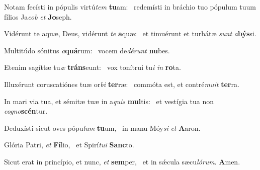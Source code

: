 \item Notam fecísti in pópulis virtú\textit{tem} \textbf{tu}am:~\psstar{} redemísti in bráchio tuo pópulum tuum fílios Ja\textit{cob} \textit{et} \textbf{Jo}seph.

\item Vidérunt te aquæ, Deus, vidérunt \textit{te} \textbf{a}quæ:~\psstar{} et timuérunt et turbátæ \textit{sunt} \textit{a}\textbf{býs}si.

\item Multitúdo sónitus \textit{a}\textbf{quá}rum:~\psstar{} vocem de\textit{dérunt} \textbf{nu}bes.

\item Etenim sagíttæ tu\textit{æ} \textbf{tráns}eunt:~\psstar{} vox tonítrui tu\textit{i} \textit{in} \textbf{ro}ta.

\item Illuxérunt coruscatiónes tuæ or\textit{bi} \textbf{ter}ræ:~\psstar{} commóta est, et contré\textit{muit} \textbf{ter}ra.

\item In mari via tua, et sémitæ tuæ in a\textit{quis} \textbf{mul}tis:~\psstar{} et vestígia tua non \textit{cogno}\textbf{scén}tur.

\item Deduxísti sicut oves pópu\textit{lum} \textbf{tu}um,~\psstar{} in manu Móy\textit{si} \textit{et} \textbf{A}aron.

\item Glória Patri, \textit{et} \textbf{Fí}lio,~\psstar{} et Spirí\textit{tui} \textbf{Sanc}to.

\item Sicut erat in princípio, et nunc, \textit{et} \textbf{sem}per,~\psstar{} et in sǽcula sæcu\textit{lórum}. \textbf{A}men.
